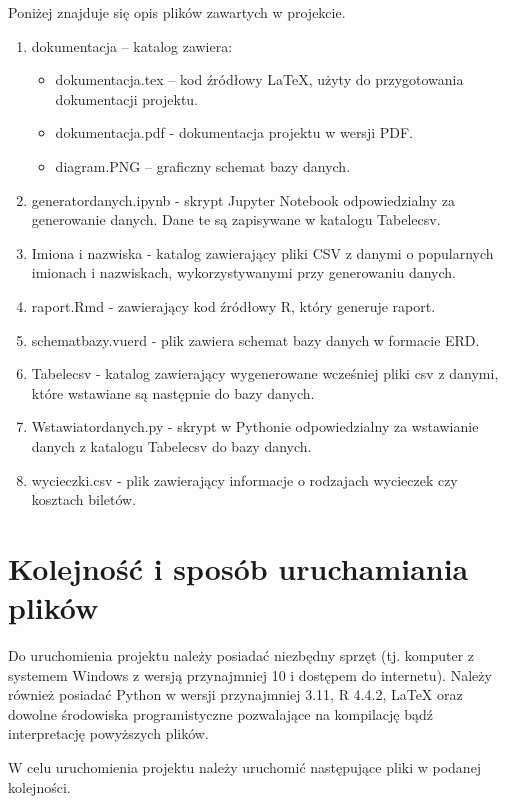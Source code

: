 \documentclass{article}
\begin{document}
	Poniżej znajduje się opis plików zawartych w projekcie.
	\begin{enumerate}
		\item dokumentacja – katalog zawiera:
		\begin{itemize}
			\item dokumentacja.tex – kod źródłowy LaTeX, użyty do przygotowania dokumentacji projektu.
			\item dokumentacja.pdf - dokumentacja projektu w wersji PDF.
			\item diagram.PNG – graficzny schemat bazy danych.
		\end{itemize}
		\item generator\textunderscore danych.ipynb - skrypt Jupyter Notebook odpowiedzialny za generowanie danych. Dane te są zapisywane w katalogu Tabele\textunderscore csv.
		\item Imiona i nazwiska - katalog zawierający pliki CSV z danymi o popularnych imionach i nazwiskach, wykorzystywanymi przy generowaniu danych.
		\item raport.Rmd - zawierający kod źródłowy R, który generuje raport.
		\item schemat\textunderscore bazy.vuerd - plik zawiera schemat bazy danych w formacie ERD.
		\item Tabele\textunderscore csv - katalog zawierający wygenerowane wcześniej pliki csv z danymi, które wstawiane są następnie do bazy danych.
		\item Wstawiator\textunderscore danych.py - skrypt w Pythonie odpowiedzialny za wstawianie danych z katalogu Tabele\textunderscore csv do bazy danych.
		\item wycieczki.csv - plik zawierający informacje o rodzajach wycieczek czy kosztach biletów.
	\end{enumerate}
	
	\section{Kolejność i sposób uruchamiania plików}
	
	Do uruchomienia projektu należy posiadać niezbędny sprzęt (tj. komputer z systemem Windows z wersją przynajmniej 10 i dostępem do internetu). Należy również posiadać Python w wersji przynajmniej 3.11, R 4.4.2, LaTeX oraz dowolne środowiska programistyczne pozwalające na kompilację bądź interpretację powyższych plików.
	
	W celu uruchomienia projektu należy uruchomić następujące pliki w podanej kolejności.
	
\end{document}
